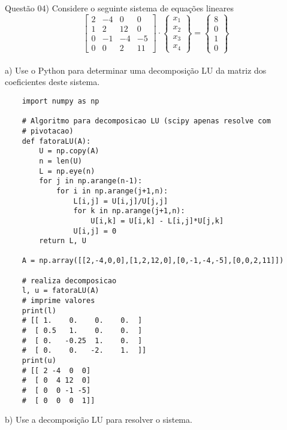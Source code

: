 
\noindent \textcolor{COLOR1}{Questão 04)} Considere o seguinte sistema de equações lineares
\\

\[
    \begin{bmatrix}
        2 & -4 & 0  & 0  \\
        1 & 2  & 12 & 0  \\
        0 & -1 & -4 & -5 \\
        0 & 0  & 2  & 11
    \end{bmatrix}
    \cdot
    \begin{Bmatrix}
        x_1 \\
        x_2 \\
        x_3 \\
        x_4
    \end{Bmatrix}
    =
    \begin{Bmatrix}
        8 \\
        0 \\
        1 \\
        0
    \end{Bmatrix}
\]
\\

a) Use o Python para determinar uma decomposição LU da matriz dos coeficientes deste
sistema.
\\

\begin{lstlisting}
    import numpy as np

    # Algoritmo para decomposicao LU (scipy apenas resolve com
    # pivotacao)
    def fatoraLU(A):  
        U = np.copy(A)  
        n = len(U)
        L = np.eye(n)  
        for j in np.arange(n-1):  
            for i in np.arange(j+1,n):  
                L[i,j] = U[i,j]/U[j,j]  
                for k in np.arange(j+1,n):  
                    U[i,k] = U[i,k] - L[i,j]*U[j,k]  
                U[i,j] = 0  
        return L, U
    
    A = np.array([[2,-4,0,0],[1,2,12,0],[0,-1,-4,-5],[0,0,2,11]])
    
    # realiza decomposicao
    l, u = fatoraLU(A)
    # imprime valores
    print(l)
    # [[ 1.    0.    0.    0.  ]
    #  [ 0.5   1.    0.    0.  ]
    #  [ 0.   -0.25  1.    0.  ]
    #  [ 0.    0.   -2.    1.  ]]
    print(u)
    # [[ 2 -4  0  0]
    #  [ 0  4 12  0]
    #  [ 0  0 -1 -5]
    #  [ 0  0  0  1]]
\end{lstlisting}


b) Use a decomposição LU para resolver o sistema.
\\

